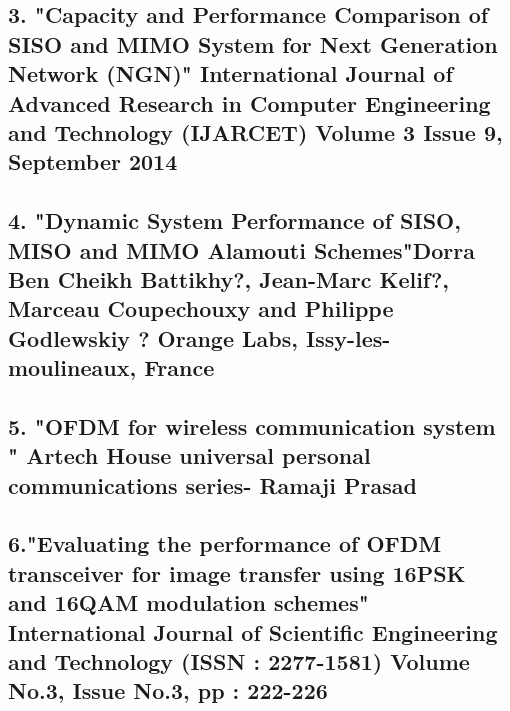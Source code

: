 \documentclass[12pt]{report}
\begin{document}
\subsection*{3. "Capacity and Performance Comparison of SISO and MIMO System for Next Generation Network (NGN)" International Journal of Advanced Research in Computer Engineering and Technology (IJARCET)
Volume 3 Issue 9, September 2014}
\subsection*{4. "Dynamic System Performance of SISO, MISO and
MIMO Alamouti Schemes"Dorra Ben Cheikh Battikhy?, Jean-Marc Kelif?, Marceau Coupechouxy and Philippe Godlewskiy
? Orange Labs, Issy-les-moulineaux, France }
\subsection*{5. "OFDM for wireless communication system " Artech House universal personal communications series- Ramaji Prasad}
\subsection*{6."Evaluating the performance of OFDM transceiver for image transfer using
16PSK and 16QAM modulation schemes" International Journal of Scientific Engineering and Technology (ISSN : 2277-1581)
Volume No.3, Issue No.3, pp : 222-226}






    
    
    
\end{document}
